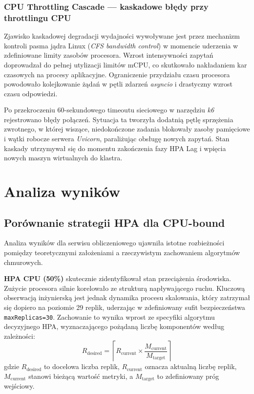 \subsubsection{CPU Throttling Cascade — kaskadowe błędy przy throttlingu CPU}

Zjawisko kaskadowej degradacji wydajności wywoływane jest przez mechanizm kontroli pasma jądra Linux (\textit{CFS bandwidth control}) w momencie uderzenia w zdefiniowane limity zasobów procesora. Wzrost intensywności zapytań doprowadzał do pełnej utylizacji limitów mCPU, co skutkowało nakładaniem kar czasowych na procesy aplikacyjne. Ograniczenie przydziału czasu procesora powodowało kolejkowanie żądań w pętli zdarzeń \textit{asyncio} i drastyczny wzrost czasu odpowiedzi. 

Po przekroczeniu 60-sekundowego timeoutu sieciowego w narzędziu \textit{k6} rejestrowano błędy połączeń. Sytuacja ta tworzyła dodatnią pętlę sprzężenia zwrotnego, w której wiszące, niedokończone zadania blokowały zasoby pamięciowe i wątki robocze serwera \textit{Uvicorn}, paraliżując obsługę nowych zapytań. Stan kaskady utrzymywał się do momentu zakończenia fazy HPA Lag i wpięcia nowych maszyn wirtualnych do klastra.

\section{Analiza wyników}

\subsection{Porównanie strategii HPA dla CPU-bound}

Analiza wyników dla serwisu obliczeniowego ujawniła istotne rozbieżności pomiędzy teoretycznymi założeniami a rzeczywistym zachowaniem algorytmów chmurowych.

\textbf{HPA CPU (50\%)} skutecznie zidentyfikował stan przeciążenia środowiska. Zużycie procesora silnie korelowało ze strukturą napływającego ruchu. Kluczową obserwacją inżynierską jest jednak dynamika procesu skalowania, który zatrzymał się dopiero na poziomie 29 replik, uderzając w zdefiniowany sufit bezpieczeństwa \texttt{maxReplicas=30}. Zachowanie to wynika wprost ze specyfiki algorytmu decyzyjnego HPA, wyznaczającego pożądaną liczbę komponentów według zależności:
\begin{equation}
  R_{\text{desired}} = \left\lceil R_{\text{current}} \times \frac{M_{\text{current}}}{M_{\text{target}}} \right\rceil
\end{equation}
gdzie $R_{\text{desired}}$ to docelowa liczba replik, $R_{\text{current}}$ oznacza aktualną liczbę replik, $M_{\text{current}}$ stanowi bieżącą wartość metryki, a $M_{\text{target}}$ to zdefiniowany próg wejściowy. 

